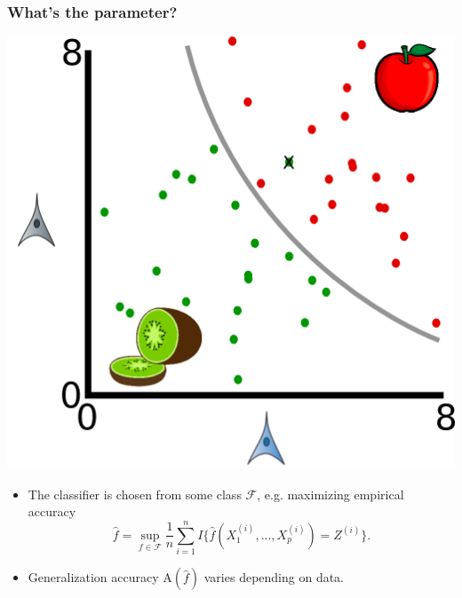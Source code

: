 \documentclass{beamer}
\begin{document}
\begin{frame}
\frametitle{What's the parameter?}
\begin{center}
\includegraphics[scale = 0.3]{intro4.png}
\end{center}
\begin{itemize}
\item The classifier is chosen from some class $\mathcal{F}$, e.g. maximizing empirical accuracy
\[
\hat{f} = \sup_{f \in \mathcal{F}} \frac{1}{n}\sum_{i=1}^n I\{\hat{f}(X^{(i)}_1,...,X^{(i)}_p) = Z^{(i)}\}.
\]
\item Generalization accuracy $\text{A}(\hat{f})$ varies depending on data.
\end{itemize}
\end{frame}
\end{document}
